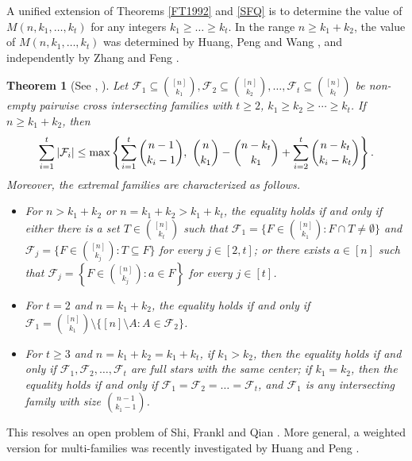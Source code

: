 \documentclass[a4paper,11pt]{article}
\newtheorem{theorem}{Theorem}[section]
\begin{document}
A unified extension of Theorems \ref{FT1992} and \ref{SFQ} is to determine the value of $M(n, k_1,  \dots, k_t)$ for any integers $k_1\geq \dots \geq k_t$.
In the range $n\geq k_1+k_2$, the value of $M(n, k_1,  \dots, k_t)$ was determined  by Huang, Peng and Wang \cite{HPW},  and independently by Zhang and Feng \cite{ZF2023}.
\begin{theorem}[See \cite{HPW}, \cite{ZF2023}]\label{HP}
Let $\mathcal{F}_1\subseteq{[n]\choose k_1}, \mathcal{F}_2\subseteq{[n]\choose k_2}, \dots, \mathcal{F}_t\subseteq{[n]\choose k_t}$ be non-empty pairwise cross intersecting families with $t\geq 2$, $k_1\geq k_2\geq \cdots \geq k_t$. If $n\geq k_1+k_2$, then 
\begin{equation*}\label{value}
\sum_{i=1}^t{|\mathcal{F}_i|}\leq \textup{max} \left\{ 
\sum_{i=1}^t{n-1\choose k_i-1},\,\,  
{n\choose k_1}-{n-k_t\choose k_1}+\sum_{i=2}^t{{n-k_t\choose k_i-k_t}}\right\}.
\end{equation*}
Moreover, the extremal families are characterized as follows. 
\begin{itemize}
  \item[(i)] For $n>k_1+k_2$ or $n=k_1+k_2>k_1+k_t$, the equality holds if and only if
 either there is a set $T\in {[n] \choose k_t}$ such that $\mathcal{F}_1=\{F\in {[n]\choose k_1}\colon  F\cap T\ne\emptyset\}$ and $\mathcal{F}_j=\{F\in {[n]\choose k_j}: T\subseteq F\}$ for every $j\in [2,t]$; or  there exists $a\in [n]$ such that $\mathcal{F}_j=\left\{F\in{[n]\choose k_j}\colon  a\in F\right\}$ for every $j\in [t]$.
 
 
  \item[(ii)] For $t=2$ and $n=k_1+k_2$,  the equality holds if and only if $\mathcal{F}_1={[n]\choose k_1}\setminus \{[n]\setminus A\colon A\in \mathcal{F}_2\}$.
  
  
  \item[(iii)] For $t\geq 3$ and $n=k_1+k_2=k_1+k_t$, if $k_1>k_2$, then the equality holds if and only if $\mathcal{F}_1, \mathcal{F}_2,\ldots, \mathcal{F}_t$ are full stars with the same center; if $k_1=k_2$,  then the equality holds if and only if $\mathcal{F}_1=\mathcal{F}_2=\dots=\mathcal{F}_t$, and $\mathcal{F}_1$ is any intersecting family with size $\binom{n-1}{k_1-1}$.
\end{itemize}
\end{theorem}

This resolves an open problem of Shi, Frankl and Qian \cite[Problem 4.3]{SFQ2020}. More general,  a weighted version for multi-families was recently investigated by Huang and Peng \cite{HP+}.
\end{document}
